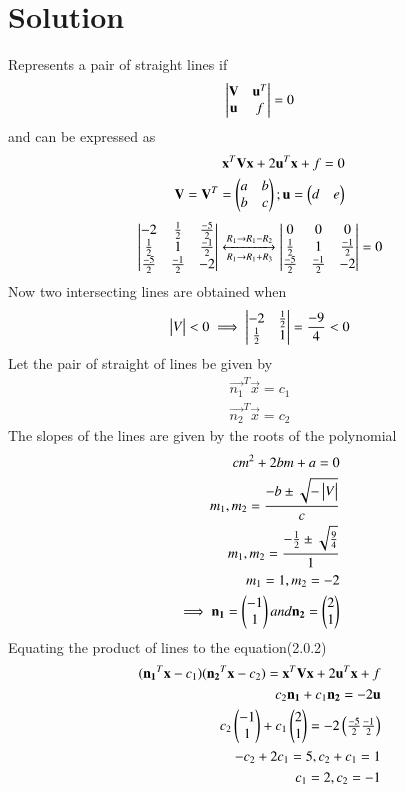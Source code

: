 \documentclass[journal,12pt,twocolumn]{IEEEtran}
\begin{document}
\section{Solution}
Represents a pair of straight lines if
\begin{align}
\begin{vmatrix}
\mathbf{V}&\mathbf{u}^T\\
\mathbf{u}&f\end{vmatrix} = 0
\end{align}
and can be expressed as
\begin{align}
\mathbf{x}^T\mathbf{V}\mathbf{x}+2\mathbf{u}^T\mathbf{x}+f=0 \\
\mathbf{V}=\mathbf{V}^T=\begin{pmatrix}a & b \\ b & c\end{pmatrix} ;
\mathbf{u}=\begin{pmatrix}d & e\end{pmatrix}
\end{align}
\begin{align}
\begin{vmatrix}
-2&\frac{1}{2}&\frac{-5}{2}\\
\frac{1}{2}&1&\frac{-1}{2}\\
\frac{-5}{2}&\frac{-1}{2}&-2\end{vmatrix}
\xleftrightarrow[R_1\rightarrow R_1+R_3]{R_1\rightarrow R_1-R_2}
\begin{vmatrix}
0&0&0\\
\frac{1}{2}&1&\frac{-1}{2}\\
\frac{-5}{2}&\frac{-1}{2}&-2\end{vmatrix}=0
\end{align}
Now two intersecting lines are obtained when
\begin{align}
\begin{vmatrix}V\end{vmatrix} < 0 
\implies \begin{vmatrix}-2&\frac{1}{2}\\\frac{1}{2}&1\end{vmatrix}
=\frac{-9}{4} < 0
\end{align}
Let the pair of straight of lines be given by
\begin{align}
\vec{n_1}^T\vec{x}=c_1\\
\vec{n_2}^T\vec{x}=c_2
\end{align}
The slopes of the lines are given by the roots of the polynomial 
\begin{align}
cm^2+2bm+a=0 \\
m_1,m_2 = \frac{-b\pm\sqrt{-\begin{vmatrix}V\end{vmatrix}}}{c}\\
m_1,m_2 = \frac{-\frac{1}{2}\pm\sqrt{\frac{9}{4}}}{1}\\
m_1= 1 , m_2 =-2\\
\implies\mathbf{n_1}=\begin{pmatrix}-1\\1\end{pmatrix} and \mathbf{n_2}=\begin{pmatrix}2\\1\end{pmatrix}
\end{align}
Equating the product of lines to the equation(2.0.2)
\begin{align}
(\mathbf{n_1}^T\mathbf{x}-c_1)(\mathbf{n_2}^T\mathbf{x}-c_2)=
\mathbf{x}^T\mathbf{V}\mathbf{x}+2\mathbf{u}^T\mathbf{x}+f \\
c_2\mathbf{n_1}+c_1\mathbf{n_2}=-2\mathbf{u}\\ c_2\begin{pmatrix}-1\\1\end{pmatrix}+c_1\begin{pmatrix}2\\1\end{pmatrix}=-2\begin{pmatrix}\frac{-5}{2}\frac{-1}{2}\end{pmatrix}\\
-c_2+2c_1=5 , c_2+c_1=1\\
c_1=2 , c_2=-1
\end{align}
\end{document}
